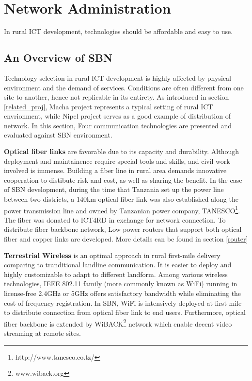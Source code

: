 \chapter{Network Administration}
In rural ICT development, technologies should be affordable and easy to use.
\section{An Overview of SBN}
Technology selection in rural ICT development is highly affected by physical environment and the demand of services. Conditions are often different from one site to another, hence not replicable in its entirety. As introduced in section \ref{related_proj}, Macha project represents a typical setting of rural ICT envrionment, while Nipel project serves as a good example of distribution of network. In this section, Four communication technologies are presented and evaluated against SBN environment.

\textbf{Optical fiber links} are favorable due to its capacity and durability. Although deployment and maintainence require special tools and skills, and civil work involved is immense. Building a fiber line in rural area demands innovative cooperation to distibute risk and cost, as well as sharing the benefit. In the case of SBN development, during the time that Tanzania set up the power line between two districts, a 140km optical fiber link was also established along the power transmission line and owned by Tanzanian power company, TANESCO\footnote{http://www.tanesco.co.tz/}. The fiber was donated to ICT4RD in exchange for network connection. To distribute fiber backbone network, Low power routers that support both optical fiber and copper links are developed. More details can be found in section \ref{router}

\textbf{Terrestrial Wireless} is an optimal approach in rural first-mile delivery comparing to tranditional landline communication. It is easier to deploy and highly customizable to adapt to different landform. Among various wireless technologies, IEEE 802.11 family (more commonly known as WiFi) running in license-free 2.4GHz or 5GHz offers satisfactory bandwidth while eliminating the cost of frequency registration. In SBN, WiFi is intensively deployed at first mile to distribute connection from optical fiber link to end users. Furthermore, optical fiber backbone is extended by WiBACK\footnote{www.wiback.org} network which enable decent video streaming at remote sites.

